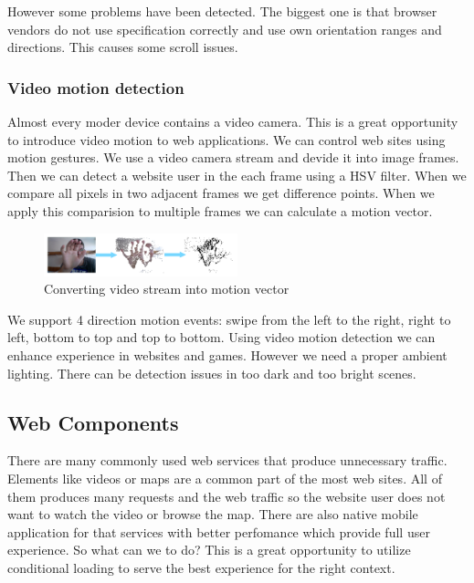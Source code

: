 \documentclass{iitsrc}
\begin{document}
\noindent However some problems have been detected. The biggest one is that browser vendors do not use specification correctly and use own orientation ranges and directions. This causes some scroll issues.


\subsubsection{Video motion detection} %
\label{ssub:video_camera_motion}

Almost every moder device contains a video camera. This is a great opportunity to introduce video motion to web applications. We can control web sites using motion gestures. We use a video camera stream and devide it into image frames. Then we can detect a website user in the each frame using a HSV filter. When we compare all pixels in two adjacent frames we get difference points. When we apply this comparision to multiple frames we can calculate a motion vector.

\begin{figure}[ht]
    \begin{center}
        \includegraphics[width=0.5\textwidth]{../images/videomotion}
        \caption{Converting video stream into motion vector}
        \label{fig:videomotion}
    \end{center}
\end{figure}

\noindent We support 4 direction motion events: swipe from the left to the right, right to left, bottom to top and top to bottom. Using video motion detection we can enhance experience in websites and games. However we need a proper ambient lighting. There can be detection issues in too dark and too bright scenes.




\subsection{Web Components} %
\label{sub:web_components}

There are many commonly used web services that produce unnecessary traffic. Elements like videos or maps are a common part of the most web sites. All of them produces many requests and the web traffic so the website user does not want to watch the video or browse the map. There are also native mobile application for that services with better perfomance which provide full user experience. So what can we to do? This is a great opportunity to utilize conditional loading to serve the best experience for the right context.
\end{document}
